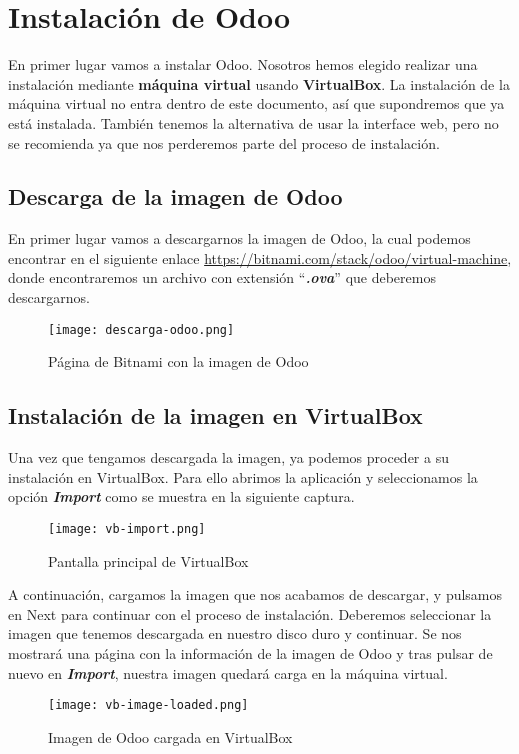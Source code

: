 \section{Instalación de Odoo}
En primer lugar vamos a instalar Odoo. Nosotros hemos elegido realizar una instalación mediante \textbf{máquina virtual} usando \textbf{VirtualBox}. La instalación de la máquina virtual no entra dentro de este documento, así que supondremos que ya está instalada. También tenemos la alternativa de usar la interface web, pero no se recomienda ya que nos perderemos parte del proceso de instalación.

\subsection{Descarga de la imagen de Odoo}
En primer lugar vamos a descargarnos la imagen de Odoo, la cual podemos encontrar en el siguiente enlace \url{https://bitnami.com/stack/odoo/virtual-machine}, donde encontraremos un archivo con extensión ``\textbf{\textit{.ova}}'' que deberemos descargarnos.

\begin{figure}[h]
    \centering
    \texttt{[image: descarga-odoo.png]}
    \caption{Página de Bitnami con la imagen de Odoo}
\end{figure}


\subsection{Instalación de la imagen en VirtualBox}
Una vez que tengamos descargada la imagen, ya podemos proceder a su instalación en VirtualBox. Para ello abrimos la aplicación y seleccionamos la opción \textit{\textbf{Import}} como se muestra en la siguiente captura.

\begin{figure}[h]
    \centering
    \texttt{[image: vb-import.png]}
    \caption{Pantalla principal de VirtualBox}
\end{figure}

A continuación, cargamos la imagen que nos acabamos de descargar, y pulsamos en Next para continuar con el proceso de instalación. Deberemos seleccionar la imagen que tenemos descargada en nuestro disco duro y continuar. Se nos mostrará una página con la información de la imagen de Odoo y tras pulsar de nuevo en \textbf{\textit{Import}}, nuestra imagen quedará carga en la máquina virtual.

\begin{figure}[h]
    \centering
    \texttt{[image: vb-image-loaded.png]}
    \caption{Imagen de Odoo cargada en VirtualBox}
\end{figure}


